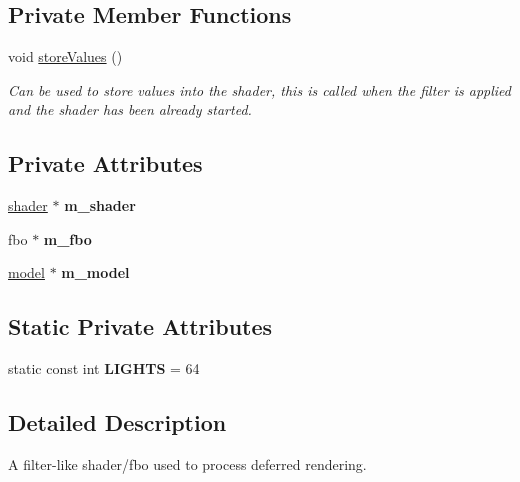 \subsection*{Private Member Functions}
\begin{DoxyCompactItemize}
\item 
void \hyperlink{classflounder_1_1rendererdeferred_ac3beedaeb1e55b6bda9bde42f46184aa}{store\+Values} ()
\begin{DoxyCompactList}\small\item\em Can be used to store values into the shader, this is called when the filter is applied and the shader has been already started. \end{DoxyCompactList}\end{DoxyCompactItemize}
\subsection*{Private Attributes}
\begin{DoxyCompactItemize}
\item 
\mbox{\label{classflounder_1_1rendererdeferred_ae3eefa0eac99250e83b2d8b101c3fe9d}} 
\hyperlink{classflounder_1_1shader}{shader} $\ast$ {\bfseries m\+\_\+shader}
\item 
\mbox{\label{classflounder_1_1rendererdeferred_a02c40b266bcac25a6f54f32033407a9e}} 
fbo $\ast$ {\bfseries m\+\_\+fbo}
\item 
\mbox{\label{classflounder_1_1rendererdeferred_abc35dd659549da6d45a049195e11d494}} 
\hyperlink{classflounder_1_1model}{model} $\ast$ {\bfseries m\+\_\+model}
\end{DoxyCompactItemize}
\subsection*{Static Private Attributes}
\begin{DoxyCompactItemize}
\item 
\mbox{\label{classflounder_1_1rendererdeferred_a2547fbfb8169aafa6170e70d79ef204c}} 
static const int {\bfseries L\+I\+G\+H\+TS} = 64
\end{DoxyCompactItemize}


\subsection{Detailed Description}
A filter-\/like shader/fbo used to process deferred rendering. 



